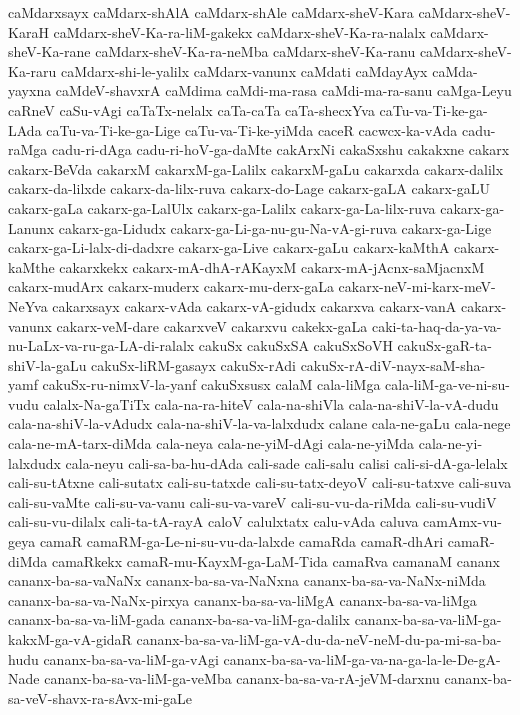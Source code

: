 {caMdarxsayx
caMdarx-shAlA
caMdarx-shAle
caMdarx-sheV-Kara
caMdarx-sheV-KaraH
caMdarx-sheV-Ka-ra-liM-gakekx
caMdarx-sheV-Ka-ra-nalalx
caMdarx-sheV-Ka-rane
caMdarx-sheV-Ka-ra-neMba
caMdarx-sheV-Ka-ranu
caMdarx-sheV-Ka-raru
caMdarx-shi-le-yalilx
caMdarx-vanunx
caMdati
caMdayAyx
caMda-yayxna
caMdeV-shavxrA
caMdima
caMdi-ma-rasa
caMdi-ma-ra-sanu
caMga-Leyu
caRneV
caSu-vAgi
caTaTx-nelalx
caTa-caTa
caTa-shecxYva
caTu-va-Ti-ke-ga-LAda
caTu-va-Ti-ke-ga-Lige
caTu-va-Ti-ke-yiMda
caceR
cacwcx-ka-vAda
cadu-raMga
cadu-ri-dAga
cadu-ri-hoV-ga-daMte
cakArxNi
cakaSxshu
cakakxne
cakarx
cakarx-BeVda
cakarxM
cakarxM-ga-Lalilx
cakarxM-gaLu
cakarxda
cakarx-dalilx
cakarx-da-lilxde
cakarx-da-lilx-ruva
cakarx-do-Lage
cakarx-gaLA
cakarx-gaLU
cakarx-gaLa
cakarx-ga-LalUlx
cakarx-ga-Lalilx
cakarx-ga-La-lilx-ruva
cakarx-ga-Lanunx
cakarx-ga-Lidudx
cakarx-ga-Li-ga-nu-gu-Na-vA-gi-ruva
cakarx-ga-Lige
cakarx-ga-Li-lalx-di-dadxre
cakarx-ga-Live
cakarx-gaLu
cakarx-kaMthA
cakarx-kaMthe
cakarxkekx
cakarx-mA-dhA-rAKayxM
cakarx-mA-jAcnx-saMjacnxM
cakarx-mudArx
cakarx-muderx
cakarx-mu-derx-gaLa
cakarx-neV-mi-karx-meV-NeYva
cakarxsayx
cakarx-vAda
cakarx-vA-gidudx
cakarxva
cakarx-vanA
cakarx-vanunx
cakarx-veM-dare
cakarxveV
cakarxvu
cakekx-gaLa
caki-ta-haq-da-ya-va-nu-LaLx-va-ru-ga-LA-di-ralalx
cakuSx
cakuSxSA
cakuSxSoVH
cakuSx-gaR-ta-shiV-la-gaLu
cakuSx-liRM-gasayx
cakuSx-rAdi
cakuSx-rA-diV-nayx-saM-sha-yamf
cakuSx-ru-nimxV-la-yanf
cakuSxsusx
calaM
cala-liMga
cala-liM-ga-ve-ni-su-vudu
calalx-Na-gaTiTx
cala-na-ra-hiteV
cala-na-shiVla
cala-na-shiV-la-vA-dudu
cala-na-shiV-la-vAdudx
cala-na-shiV-la-va-lalxdudx
calane
cala-ne-gaLu
cala-nege
cala-ne-mA-tarx-diMda
cala-neya
cala-ne-yiM-dAgi
cala-ne-yiMda
cala-ne-yi-lalxdudx
cala-neyu
cali-sa-ba-hu-dAda
cali-sade
cali-salu
calisi
cali-si-dA-ga-lelalx
cali-su-tAtxne
cali-sutatx
cali-su-tatxde
cali-su-tatx-deyoV
cali-su-tatxve
cali-suva
cali-su-vaMte
cali-su-va-vanu
cali-su-va-vareV
cali-su-vu-da-riMda
cali-su-vudiV
cali-su-vu-dilalx
cali-ta-tA-rayA
caloV
calulxtatx
calu-vAda
caluva
camAmx-vu-geya
camaR
camaRM-ga-Le-ni-su-vu-da-lalxde
camaRda
camaR-dhAri
camaR-diMda
camaRkekx
camaR-mu-KayxM-ga-LaM-Tida
camaRva
camanaM
cananx
cananx-ba-sa-vaNaNx
cananx-ba-sa-va-NaNxna
cananx-ba-sa-va-NaNx-niMda
cananx-ba-sa-va-NaNx-pirxya
cananx-ba-sa-va-liMgA
cananx-ba-sa-va-liMga
cananx-ba-sa-va-liM-gada
cananx-ba-sa-va-liM-ga-dalilx
cananx-ba-sa-va-liM-ga-kakxM-ga-vA-gidaR
cananx-ba-sa-va-liM-ga-vA-du-da-neV-neM-du-pa-mi-sa-ba-hudu
cananx-ba-sa-va-liM-ga-vAgi
cananx-ba-sa-va-liM-ga-va-na-ga-la-le-De-gA-Nade
cananx-ba-sa-va-liM-ga-veMba
cananx-ba-sa-va-rA-jeVM-darxnu
cananx-ba-sa-veV-shavx-ra-sAvx-mi-gaLe
}
